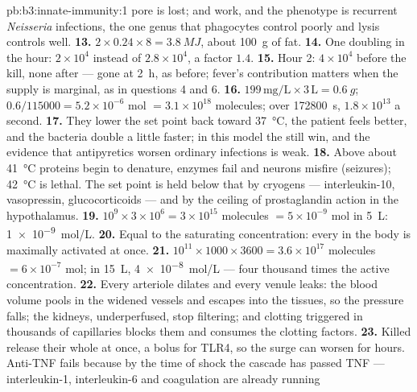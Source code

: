 \begin{solution}{pb:b3:innate-immunity:1}
pore is lost;  and  work, and the phenotype is
recurrent \emph{Neisseria} infections, the one genus that phagocytes
control poorly and lysis controls well.
\textbf{13.} $2\times 0.24\times 8 = \qty{3.8}{MJ}$, about \qty{100}{g} of
fat.
\textbf{14.} One doubling in the hour: $2\times 10^{4}$ instead of
$2.8\times 10^{4}$, a factor $1.4$.
\textbf{15.} Hour 2: $4\times 10^{4}$ before the kill, none after --- gone
at \qty{2}{h}, as before; fever's contribution matters when the
 supply is marginal, as in questions 4 and 6.
\textbf{16.} $199\,\text{mg/L}\times 3\,\text{L} = \qty{0.6}{g}$; $0.6/
\num{115000} = 5.2\times 10^{-6}$ mol $= 3.1\times 10^{18}$ molecules;
over \qty{172800}{s}, $1.8\times 10^{13}$ a second.
\textbf{17.} They lower the set point back toward \qty{37}{\celsius}, the
patient feels better, and the bacteria double a little faster; in this
model the  still win, and the evidence that antipyretics
worsen ordinary infections is weak.
\textbf{18.} Above about \qty{41}{\celsius} proteins begin to denature,
enzymes fail and neurons misfire (seizures); \qty{42}{\celsius} is
lethal. The set point is held below that by cryogens --- interleukin-10,
vasopressin, glucocorticoids --- and by the ceiling of prostaglandin
action in the hypothalamus.
\textbf{19.} $10^{9}\times 3\times 10^{6} = 3\times 10^{15}$ molecules
$= 5\times 10^{-9}$ mol in \qty{5}{L}: \qty{1e-9}{mol/L}.
\textbf{20.} Equal to the saturating concentration: every  in
the body is maximally activated at once.
\textbf{21.} $10^{11}\times 1000\times 3600 = 3.6\times 10^{17}$ molecules
$= 6\times 10^{-7}$ mol; in \qty{15}{L}, \qty{4e-8}{mol/L} --- four
thousand times the active concentration.
\textbf{22.} Every arteriole dilates and every venule leaks: the blood
volume pools in the widened vessels and escapes into the tissues, so
the pressure falls; the kidneys, underperfused, stop filtering; and
clotting triggered in thousands of capillaries blocks them and consumes
the clotting factors.
\textbf{23.} Killed  release their whole 
at once, a bolus for TLR4, so the  surge can worsen for hours.
Anti-TNF fails because by the time of shock the cascade has passed TNF
--- interleukin-1, interleukin-6 and coagulation are already running

\end{solution}
